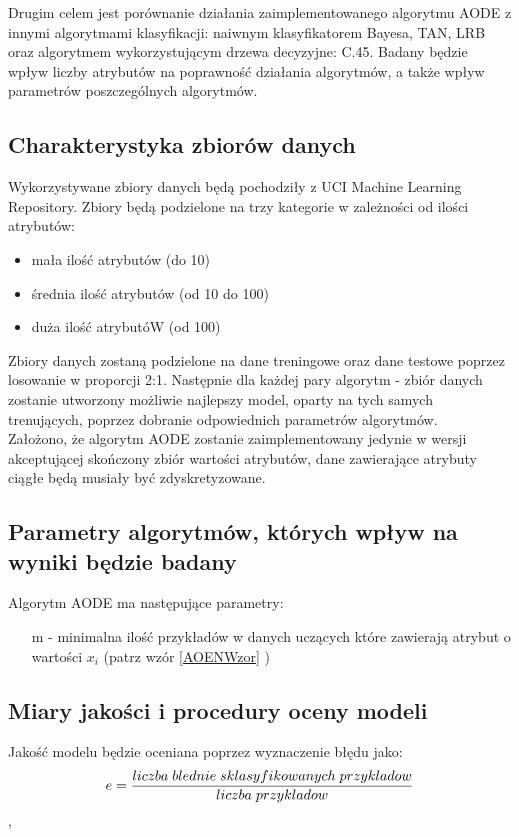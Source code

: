 \documentclass[16]{article}
\begin{document}
Drugim celem jest porównanie działania zaimplementowanego algorytmu AODE z innymi algorytmami klasyfikacji: naiwnym klasyfikatorem Bayesa, TAN, LRB oraz algorytmem wykorzystującym drzewa decyzyjne: C.45. Badany będzie wpływ liczby atrybutów na poprawność działania algorytmów, a także wpływ parametrów poszczególnych algorytmów.

\subsection{Charakterystyka zbiorów danych}
Wykorzystywane zbiory danych będą pochodziły z UCI Machine Learning Repository.
Zbiory będą podzielone na trzy kategorie w zależności od ilości atrybutów:
\begin{itemize}
	\item mała ilość atrybutów (do 10)
	\item średnia ilość atrybutów (od 10 do 100)
	\item duża ilość atrybutóW (od 100)
\end{itemize}

Zbiory danych zostaną podzielone na dane treningowe oraz dane testowe poprzez losowanie w proporcji 2:1. Następnie dla każdej pary algorytm - zbiór danych zostanie utworzony możliwie najlepszy model, oparty na tych samych trenujących, poprzez dobranie odpowiednich parametrów algorytmów. \\

Założono, że algorytm AODE zostanie zaimplementowany jedynie w wersji akceptującej skończony zbiór wartości atrybutów, dane zawierające atrybuty ciągłe będą musiały być zdyskretyzowane.

\subsection{Parametry algorytmów, których wpływ na wyniki będzie badany}
Algorytm AODE ma następujące parametry:

\begin{itemize}
	\item[m -] minimalna ilość przykładów w danych uczących które zawierają atrybut o wartości $x_i$ (patrz wzór \eqref{AOENWzor} )
\end{itemize}

\subsection{Miary jakości i procedury oceny modeli}
Jakość modelu będzie oceniana poprzez wyznaczenie błędu jako:
\begin{equation}
e =\frac{\mathnormal{liczba\;blednie\;sklasyfikowanych\;przykladow}}{\mathnormal{liczba\;przykladow}}
\end{equation},
\end{document}
